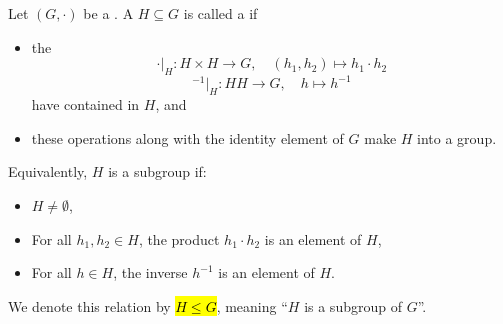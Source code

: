 \begin{definition} \label{definition:subgroup_of_a_group}
Let $(G,\cdot)$ be a . A  $H \subseteq G$ is called a  if 
\begin{itemize}
    \item the  
    $$\cdot|_H: H \times H \to G, \quad (h_1,h_2) \mapsto h_1 \cdot h_2$$
    $${}^{-1}|_H: H H \to G, \quad h \mapsto h^{-1}$$
    have  contained in $H$, and 

    \item these operations along with the identity element of $G$ make $H$ into a group. 
\end{itemize}
Equivalently, $H$ is a subgroup if:
\begin{itemize}
    \item $H \neq \emptyset$,
    \item For all $h_1,h_2 \in H$, the product $h_1 \cdot h_2$ is an element of $H$,
    \item For all $h \in H$, the inverse $h^{-1}$ is an element of $H$.
\end{itemize}
We denote this relation by \hl{$H \leq G$}, meaning ``$H$ is a subgroup of $G$''.
\end{definition}

